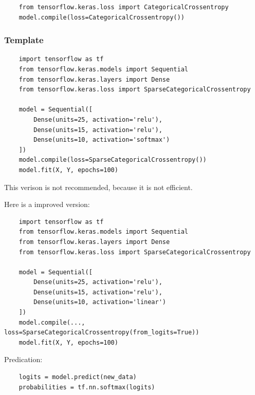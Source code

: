 \vspace{2em}
\begin{verbatim}
    from tensorflow.keras.loss import CategoricalCrossentropy
    model.compile(loss=CategoricalCrossentropy())
\end{verbatim}

\subsubsection*{Template}
\begin{verbatim}
    import tensorflow as tf
    from tensorflow.keras.models import Sequential
    from tensorflow.keras.layers import Dense
    from tensorflow.keras.loss import SparseCategoricalCrossentropy

    model = Sequential([
        Dense(units=25, activation='relu'),
        Dense(units=15, activation='relu'),
        Dense(units=10, activation='softmax')
    ])
    model.compile(loss=SparseCategoricalCrossentropy())
    model.fit(X, Y, epochs=100)
\end{verbatim}
This verison is not recommended, because it is not efficient.\par
Here is a improved version:
\begin{verbatim}
    import tensorflow as tf
    from tensorflow.keras.models import Sequential
    from tensorflow.keras.layers import Dense
    from tensorflow.keras.loss import SparseCategoricalCrossentropy

    model = Sequential([
        Dense(units=25, activation='relu'),
        Dense(units=15, activation='relu'),
        Dense(units=10, activation='linear')
    ])
    model.compile(..., loss=SparseCategoricalCrossentropy(from_logits=True))
    model.fit(X, Y, epochs=100)
\end{verbatim}
\par
Predication:
\begin{verbatim}
    logits = model.predict(new_data)
    probabilities = tf.nn.softmax(logits)
\end{verbatim}
